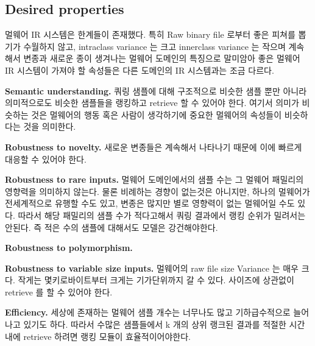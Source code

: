 \subsection{Desired properties}
멀웨어 IR 시스템은 한계들이 존재했다. 특히 Raw binary file 로부터 좋은 피쳐를 뽑기가 수월하지 않고, intraclass variance 는 크고 innerclass variance 는 작으며 계속해서 변종과 새로운 종이 생겨나는 멀웨어 도메인의 특징으로 말미암아 좋은 멀웨어 IR 시스템이 가져야 할 속성들은 다른 도메인의 IR 시스템과는 조금 다르다.

\textbf{Semantic understanding. }
쿼링 샘플에 대해 구조적으로 비슷한 샘플 뿐만 아니라 의미적으로도 비슷한 샘플들을 랭킹하고 retrieve 할 수 있어야 한다. 여기서 의미가 비슷하는 것은 멀웨어의 행동 혹은 사람이 생각하기에 중요한 멀웨어의 속성들이 비슷하다는 것을 의미한다. 


\textbf{Robustness to novelty. }
새로운 변종들은 계속해서 나타나기 때문에 이에 빠르게 대응할 수 있어야 한다. 


\textbf{Robustness to rare inputs. }
멀웨어 도메인에서의 샘플 수는 그 멀웨어 패밀리의 영향력을 의미하지 않는다. 물론 비례하는 경향이 없는것은 아니지만, 하나의 멀웨어가 전세계적으로 유행할 수도 있고, 변종은 많지만 별로 영향력이 없는 멀웨어일 수도 있다. 따라서 해당 패밀리의 샘플 수가 적다고해서 쿼링 결과에서 랭킹 순위가 밀려서는 안된다. 즉 적은 수의 샘플에 대해서도 모델은 강건해야한다. 


\textbf{Robustness to polymorphism. }


\textbf{Robustness to variable size inputs. }
멀웨어의 raw file size Variance 는 매우 크다. 작게는 몇키로바이트부터 크게는 기가단위까지 갈 수 있다. 사이즈에 상관없이 retrieve 를 할 수 있어야 한다.

\textbf{Efficiency. }
세상에 존재하는 멀웨어 샘플 개수는 너무나도 많고 기하급수적으로 늘어나고 있기도 하다. 따라서 수많은 샘플들에서 k 개의 상위 랭크된 결과를 적절한 시간 내에 retrieve 하려면 랭킹 모듈이 효율적이어야한다.



